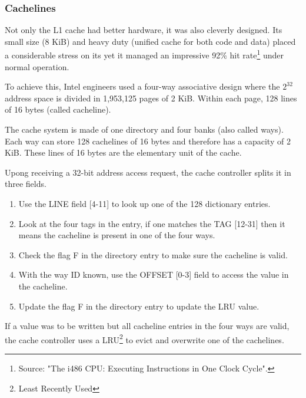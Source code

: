 \subsubsection{Cachelines}
Not only the L1 cache had better hardware, it was also cleverly designed. Its small size (8 KiB) and heavy duty (unified cache for both code and data) placed a considerable stress on its yet it managed an impressive 92\% hit rate\footnote{Source: "The i486 CPU: Executing Instructions in One Clock Cycle".} under normal operation.\\
\par
To achieve this, Intel engineers used a four-way associative design where the $2^{32}$ address space is divided in 1,953,125 pages of 2 KiB. Within each page, 128 lines of 16 bytes (called cacheline).\\
\par
{}
\par
The cache system is made of one directory and four banks (also called ways). Each way can store 128 cachelines of 16 bytes and therefore has a capacity of 2 KiB. These lines of 16 bytes are the elementary unit of the cache.\\
\par
Upong receiving a 32-bit address access request, the cache controller splits it in three fields.
\begin{enumerate}
\item Use the LINE field [4-11] to look up one of the 128 dictionary entries.
\item Look at the four tags in the entry, if one matches the TAG [12-31] then it means the cacheline is present in one of the four ways.
\item Check the flag F in the directory entry to make sure the cacheline is valid.
\item With the way ID known, use the OFFSET [0-3] field to access the value in the cacheline.
\item Update the flag F in the directory entry to update the LRU value.
\end{enumerate}
\par
If a value was to be written but all cacheline entries in the four ways are valid, the cache controller uses a LRU\footnote{Least Recently Used} to evict and overwrite one of the cachelines.\\
\par
{}
